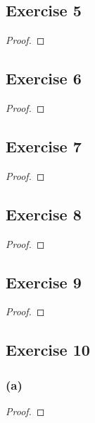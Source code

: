 \documentclass[14pt]{extarticle}
\begin{document}
\subsection{Exercise 5}

\begin{proof}

\end{proof}

\subsection{Exercise 6}

\begin{proof}

\end{proof}

\subsection{Exercise 7}

\begin{proof}

\end{proof}

\subsection{Exercise 8}

\begin{proof}

\end{proof}

\subsection{Exercise 9}

\begin{proof}

\end{proof}

\subsection{Exercise 10}

\subsubsection{(a)}

\begin{proof}

\end{proof}
\end{document}

